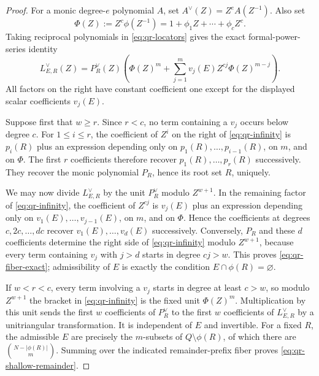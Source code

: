 \documentclass[12pt,a4paper]{amsart}
\numberwithin{equation}{section}
\theoremstyle{remark}
\begin{document}
\begin{proof}
For a monic degree-$e$ polynomial $A$, set
\(A^\vee(Z)=Z^eA(Z^{-1})\).  Also set
\[
       \Phi(Z):=Z^c\phi(Z^{-1})
       =1+\phi_1Z+\cdots+\phi_cZ^c.
\]
Taking reciprocal polynomials in \eqref{eq:qr-locators} gives the exact
formal-power-series identity
\[
 L_{E,R}^\vee(Z)=P_R^\vee(Z)
 \left(
   \Phi(Z)^m+
   \sum_{j=1}^m v_j(E)Z^{cj}\Phi(Z)^{m-j}
 \right).                                          \tag{QR5}\label{eq:qr-infinity}
\]
All factors on the right have constant coefficient one except for the
displayed scalar coefficients $v_j(E)$.

Suppose first that $w\ge r$.  Since $r<c$, no term containing a $v_j$
occurs below degree $c$.  For $1\le i\le r$, the coefficient of $Z^i$
on the right of \eqref{eq:qr-infinity} is
\(p_i(R)\) plus an expression depending only on
\(p_1(R),\ldots,p_{i-1}(R)\), on $m$, and on $\Phi$.  The first $r$
coefficients therefore recover $p_1(R),\ldots,p_r(R)$ successively.
They recover the monic polynomial $P_R$, hence its root set $R$, uniquely.

We may now divide \(L_{E,R}^\vee\) by the unit
\(P_R^\vee\) modulo $Z^{w+1}$.  In the remaining factor of
\eqref{eq:qr-infinity}, the coefficient of $Z^{cj}$ is
\(v_j(E)\) plus an expression depending only on
\(v_1(E),\ldots,v_{j-1}(E)\), on $m$, and on $\Phi$.  Hence the
coefficients at degrees $c,2c,\ldots,dc$ recover
\(v_1(E),\ldots,v_d(E)\) successively.  Conversely, $P_R$ and these $d$
coefficients determine the right side of \eqref{eq:qr-infinity} modulo
$Z^{w+1}$, because every term containing $v_j$ with $j>d$ starts in degree
$cj>w$.  This proves \eqref{eq:qr-fiber-exact}; admissibility of $E$ is
exactly the condition $E\cap\phi(R)=\varnothing$.

If $w<r<c$, every term involving a $v_j$ starts in degree at least
$c>w$, so modulo $Z^{w+1}$ the bracket in \eqref{eq:qr-infinity} is the
fixed unit $\Phi(Z)^m$.  Multiplication by this unit sends the first $w$
coefficients of $P_R^\vee$ to the first $w$ coefficients of
$L_{E,R}^\vee$ by a unitriangular transformation.  It is independent of
$E$ and invertible.  For a fixed $R$, the admissible $E$ are precisely the
$m$-subsets of $Q\setminus\phi(R)$, of which there are
\(\binom{N-|\phi(R)|}{m}\).  Summing over the indicated remainder-prefix
fiber proves \eqref{eq:qr-shallow-remainder}.
\end{proof}
\end{document}
